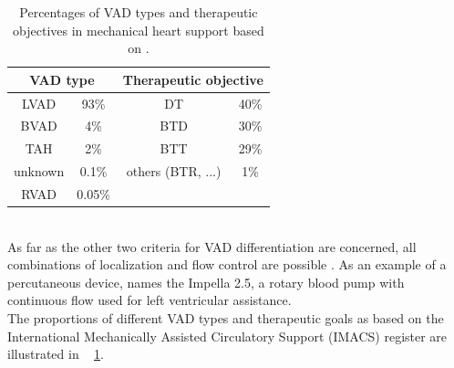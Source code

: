 \begin{table}[ht]
  \centering
  \begin{tabular}{cc|cc}
    \toprule
    \multicolumn{2}{c|}{VAD type} &
    \multicolumn{2}{c}{Therapeutic objective} \\
    \midrule
    LVAD & 93\% & DT & 40\%\\
    BVAD & 4\% & BTD & 30\%\\
    TAH & 2\% & BTT & 29\%\\
    unknown & 0.1\% & others (BTR, ...) & 1\%\\
    RVAD & 0.05\% & &\\
    \bottomrule
\end{tabular}
  \caption[Distribution of VAD types and therapeutic objectives]{Percentages of VAD types and therapeutic objectives in mechanical heart support based on \cite{VAD7}.}
  \label{tab:Table2}
\end{table}
\\As far as the other two criteria for VAD differentiation are concerned, all combinations of localization and flow control are possible \cite{VAD10}. As an example of a percutaneous device, \cite{VAD7} names the Impella 2.5, a rotary blood pump with continuous flow used for left ventricular assistance.
\\The proportions of different VAD types and therapeutic goals as based on the International Mechanically Assisted Circulatory Support (IMACS) register are illustrated in \tablename~ \ref{tab:Table2}.
